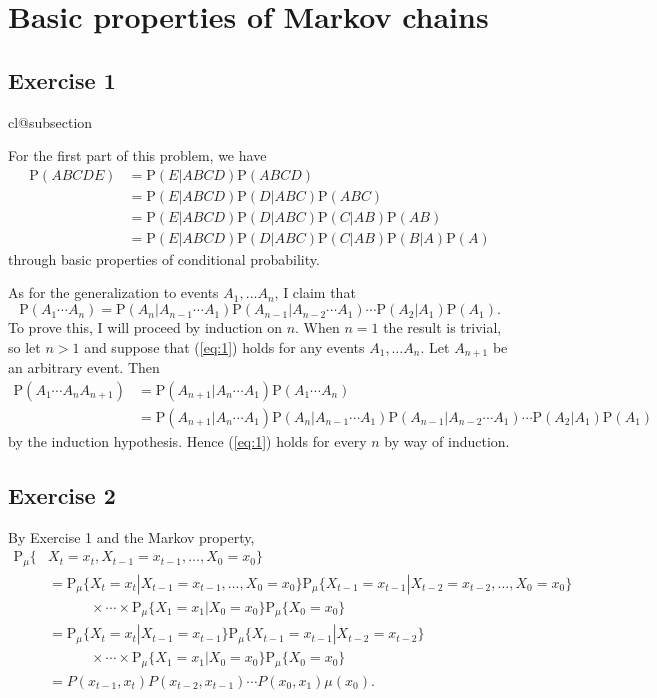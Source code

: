 \documentclass[12pt]{article}
\makeatletter
\def\nullstepcounter#1{%
	\begingroup
		\let\@elt\@stpelt
		\csname cl@#1\endcsname
	\endgroup}
\newcommand{\Prob}{\mathrm{P}}
\makeatother
\begin{document}
\section*{Basic properties of Markov chains}

\subsection*{Exercise 1}
\nullstepcounter{subsection}

For the first part of this problem, we have
\begin{align*}
\Prob(ABCDE) &= \Prob(E | ABCD) \Prob(ABCD) \\
&= \Prob(E | ABCD) \Prob(D | ABC) \Prob(ABC) \\
&= \Prob(E | ABCD) \Prob(D | ABC) \Prob(C | AB) \Prob(AB) \\
&= \Prob(E | ABCD) \Prob(D | ABC) \Prob(C | AB) \Prob(B | A) \Prob(A)
\end{align*}
through basic properties of conditional probability.

As for the generalization to events $A_1, \ldots A_n$, I claim that
\begin{equation} \label{eq:1}
\Prob(A_1 \cdots A_n) = \Prob(A_n | A_{n-1} \cdots A_1) \Prob(A_{n-1} | A_{n-2} \cdots A_1) \cdots \Prob(A_2 | A_1) \Prob(A_1).
\end{equation}
To prove this, I will proceed by induction on $n$. When $n = 1$ the result is trivial, so let $n > 1$ and suppose that (\ref{eq:1}) holds for any events $A_1, \ldots A_n$. Let $A_{n+1}$ be an arbitrary event. Then
\begin{align*}
\Prob(A_1 \cdots A_n A_{n+1}) &= \Prob(A_{n+1} | A_n \cdots A_1) \Prob(A_1 \cdots A_n) \\
&= \Prob(A_{n+1} | A_n \cdots A_1) \Prob(A_n | A_{n-1} \cdots A_1) \Prob(A_{n-1} | A_{n-2} \cdots A_1) \cdots \Prob(A_2 | A_1) \Prob(A_1)
\end{align*}
by the induction hypothesis. Hence (\ref{eq:1}) holds for every $n$ by way of induction.

\subsection*{Exercise 2}

By Exercise 1 and the Markov property,
\begin{align*}
\Prob_\mu \{&X_t = x_t, X_{t-1} = x_{t-1}, \ldots, X_0 = x_0\} \\
&= \Prob_\mu \{X_t = x_t | X_{t-1} = x_{t-1}, \ldots, X_0 = x_0\} \Prob_\mu \{X_{t-1} = x_{t-1} | X_{t-2} = x_{t-2}, \ldots, X_0 = x_0\} \\
&\qquad\quad \times \cdots \times \Prob_\mu \{X_1 = x_1 | X_0 = x_0\} \Prob_\mu \{X_0 = x_0\} \\
&= \Prob_\mu \{X_t = x_t | X_{t-1} = x_{t-1}\} \Prob_\mu \{X_{t-1} = x_{t-1} | X_{t-2} = x_{t-2}\} \\
&\qquad\quad \times \cdots \times \Prob_\mu \{X_1 = x_1 | X_0 = x_0\} \Prob_\mu \{X_0 = x_0\} \\
&= P(x_{t-1}, x_t) P(x_{t-2}, x_{t-1}) \cdots P(x_0, x_1) \mu(x_0).
\end{align*}
\end{document}
